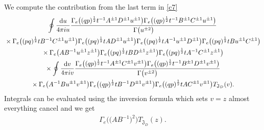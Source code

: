 \documentclass[a4paper,12pt]{article}
\begin{document}
We compute the contribution from the last term in \eqref{c7}
\begin{gather*}
\oint\frac{{\rm d}u}{4\pi i u} \frac{\Gamma_e\big((q p)^{\frac12 }t^{-1} A^{\pm1} D^{\pm1}u^{\pm1}\big)
\Gamma_e\big((q p)^{\frac12 }t^{-1} B^{\pm1} C^{\pm1}u^{\pm1}\big)}{\Gamma\big(u^{\pm2}\big)}\\
{}\times\Gamma_e\big((pq)^\frac12 t B^{-1} C^{\pm1}u^{\pm1}\big)
\Gamma_e\big((pq)^\frac12 t A D^{\pm1}u^{\pm1}\big)
\Gamma_e\big((pq)^\frac{1}{2}tA^{-1}u^{\pm1}D^{\pm1}\big)
\Gamma_e\big((pq)^\frac{1}{2}t B u^{\pm1}C^{\pm1}\big)\\
{}\times\Gamma_e\big(A B^{-1}u^{\pm1}z^{\pm1}\big)
\Gamma_e\big((pq)^{\frac{1}{2}}t B D^{\pm1}z^{\pm1}\big)
\Gamma_e\big((pq)^{\frac{1}{2}}t A^{-1}C^{\pm1}z^{\pm1}\big)\\
{}\times\oint\frac{{\rm d}v}{4\pi i v} \frac{\Gamma_e\big((q p)^{\frac12 }t^{-1} A^{\pm1} C^{\pm1}v^{\pm1}\big)
\Gamma_e\big((q p)^{\frac12 }t^{-1} B^{\pm1} D^{\pm1}v^{\pm1}\big)}{\Gamma\big(v^{\pm2}\big)}\\
{}\times\Gamma_e\big( A^{-1}B u^{\pm1} v^{\pm1}\big)\Gamma_e\big((qp)^{\frac12}t B^{-1}D^{\pm1} v^{\pm1}\big)
\Gamma_e\big((q p)^{\frac12}t A C^{\pm1} v^{\pm1}\big)T_{{\mathfrak J}_D}(v) .
\end{gather*}
Integrals can be evaluated using the inversion formula which sets $v=z$ almost everything cancel and we get
\begin{gather*}
\Gamma_e\big(\big(AB^{-1}\big)^2\big)T_{{\mathfrak J}_D}(z) .
\end{gather*}
\end{document}

